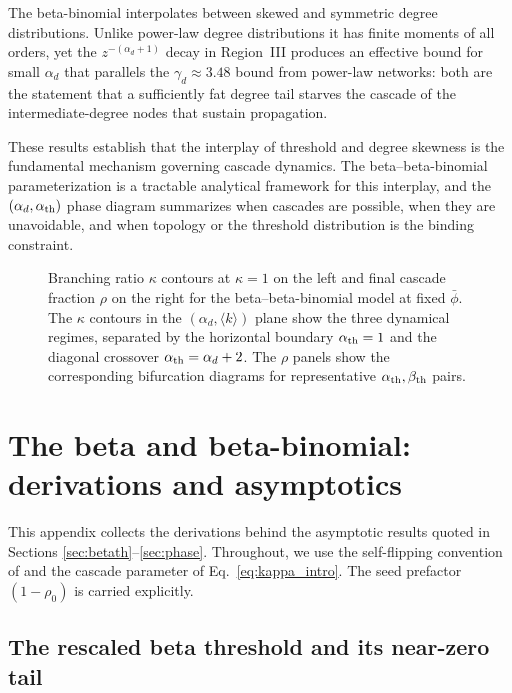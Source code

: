 \documentclass[]{revtex4-2}
\begin{document}
The beta-binomial interpolates between skewed and symmetric degree distributions. Unlike power-law degree distributions it has finite moments of all orders, yet the $z^{-(\alpha_d+1)}$ decay in Region~III produces an effective bound for small $\alpha_d$ that parallels the $\gamma_d\approx3.48$ bound from power-law networks: both are the statement that a sufficiently fat degree tail starves the cascade of the intermediate-degree nodes that sustain propagation.

These results establish that the interplay of threshold and degree skewness is the fundamental mechanism governing cascade dynamics. The beta--beta-binomial parameterization is a tractable analytical framework for this interplay, and the $(\alpha_d,\alpha_{\rm th})$ phase diagram summarizes when cascades are possible, when they are unavoidable, and when topology or the threshold distribution is the binding constraint.

\begin{figure}[t]
\centering
{}
\caption{Branching ratio $\kappa$ contours at $\kappa=1$ on the left and final cascade fraction $\rho$ on the right for the beta--beta-binomial model at fixed $\bar\phi$. The $\kappa$ contours in the $(\alpha_d,\langle k\rangle)$ plane show the three dynamical regimes, separated by the horizontal boundary $\alpha_{\rm th}=1$ and the diagonal crossover $\alpha_{\rm th}=\alpha_d+2$. The $\rho$ panels show the corresponding bifurcation diagrams for representative $\alpha_{\rm th},\beta_{\rm th}$ pairs.}
\label{fig:bb-phase}
\end{figure}

\appendix
\section{The beta and beta-binomial: derivations and asymptotics}
\label{app:deriv}

This appendix collects the derivations behind the asymptotic results quoted in Sections \ref{sec:betath}--\ref{sec:phase}. Throughout, we use the self-flipping convention of \citet{GleesonCahalane2007} and the cascade parameter of Eq.~\eqref{eq:kappa_intro}. The seed prefactor $(1-\rho_0)$ is carried explicitly.

\subsection{The rescaled beta threshold and its near-zero tail}
\end{document}
